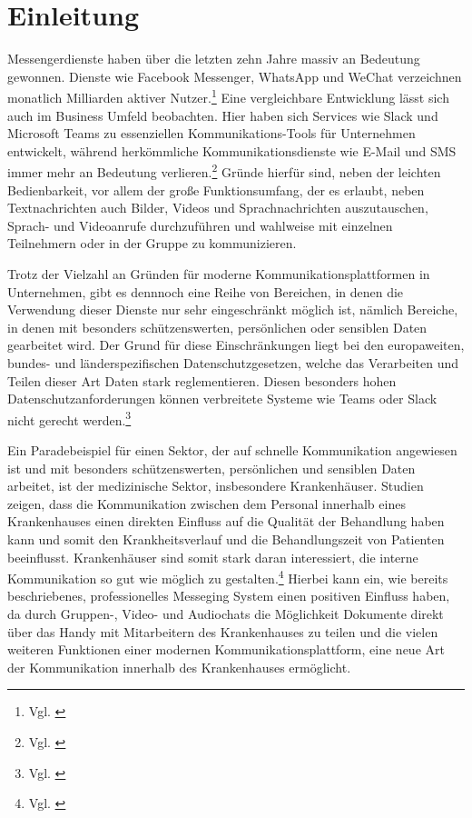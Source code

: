 \chapter{Einleitung}\label{chapter:einleitung}

Messengerdienste haben über die letzten zehn Jahre massiv an Bedeutung gewonnen. Dienste wie Facebook Messenger, WhatsApp und WeChat verzeichnen monatlich Milliarden aktiver Nutzer.\footnote{Vgl. \cite{Ballve2014}} Eine vergleichbare Entwicklung lässt sich auch im Business Umfeld beobachten. Hier haben sich Services wie Slack und Microsoft Teams zu essenziellen Kommunikations-Tools für Unternehmen entwickelt, während herkömmliche Kommunikationsdienste wie E-Mail und SMS immer mehr an Bedeutung verlieren.\footnote{Vgl. \cite{Richter2019}}
Gründe hierfür sind, neben der leichten Bedienbarkeit, vor allem der große Funktionsumfang, der es erlaubt, neben Textnachrichten auch Bilder, Videos und Sprachnachrichten auszutauschen, Sprach- und Videoanrufe durchzuführen und wahlweise mit einzelnen Teilnehmern oder in der Gruppe zu kommunizieren.

Trotz der Vielzahl an Gründen für moderne Kommunikationsplattformen in Unternehmen, gibt es dennnoch eine Reihe von Bereichen, in denen die Verwendung dieser Dienste nur sehr eingeschränkt möglich ist, nämlich Bereiche, in denen mit besonders schützenswerten, persönlichen oder sensiblen Daten gearbeitet wird. Der Grund für diese Einschränkungen liegt bei den europaweiten, bundes- und länderspezifischen Datenschutzgesetzen, welche das Verarbeiten und Teilen dieser Art Daten stark reglementieren. Diesen besonders hohen Datenschutzanforderungen können verbreitete Systeme wie Teams oder Slack nicht gerecht werden.\footnote{Vgl. \cite{Datenschutzkonferenz2019}}

Ein Paradebeispiel für einen Sektor, der auf schnelle Kommunikation angewiesen ist und mit besonders schützenswerten, persönlichen und sensiblen Daten arbeitet, ist der medizinische Sektor, insbesondere Krankenhäuser. Studien zeigen, dass die Kommunikation zwischen dem Personal innerhalb eines Krankenhauses einen direkten Einfluss auf die Qualität der Behandlung haben kann und somit den Krankheitsverlauf und die Behandlungszeit von Patienten beeinflusst. Krankenhäuser sind somit stark daran interessiert, die interne Kommunikation so gut wie möglich zu gestalten.\footnote{Vgl. \cite{G.Murphy2010}} Hierbei kann ein, wie bereits beschriebenes, professionelles Messeging System einen positiven Einfluss haben, da durch Gruppen-, Video- und Audiochats die Möglichkeit Dokumente direkt über das Handy mit Mitarbeitern des Krankenhauses zu teilen und die vielen weiteren Funktionen einer modernen Kommunikationsplattform, eine neue Art der Kommunikation innerhalb des Krankenhauses ermöglicht.

